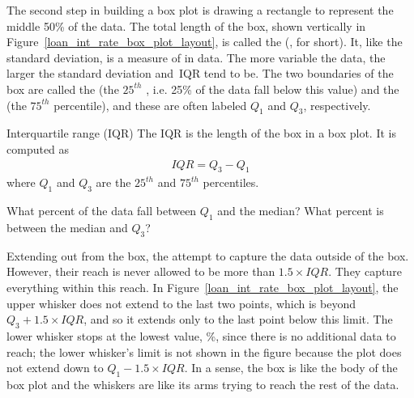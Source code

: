 The second step in building a box plot is drawing
a rectangle to represent the middle 50\% of the data.
The total length of the box, shown vertically in
Figure~\ref{loan_int_rate_box_plot_layout},
is called the  (,
for short).
It, like the standard deviation, is a measure
of  in data.
The more variable the data, the larger the standard
deviation and~IQR tend to be.
The two boundaries of the box are called the
 
(the $25^{th}$ ,
i.e. 25\% of the data fall below this value)
and the  
(the $75^{th}$ percentile), and these are often labeled $Q_1$
 and $Q_3$,
respectively.

\begin{onebox}{Interquartile range (IQR)}
  The IQR is the length
  of the box in a box plot.
  It is computed as
  \begin{eqnarray*}
  IQR = Q_3 - Q_1
  \end{eqnarray*}
  where $Q_1$ and $Q_3$ are the $25^{th}$ and $75^{th}$
  percentiles.
\end{onebox}

\begin{exercisewrap}
\begin{nexercise}
What percent of the data fall between $Q_1$ and the median?
What percent is between the median and $Q_3$?\footnotemark{}
\end{nexercise}
\end{exercisewrap}

Extending out from the box, the  attempt
to capture the data outside of the box.
However, their reach is never allowed to be more than
$1.5\times IQR$.
They capture everything within this reach.
In Figure~\ref{loan_int_rate_box_plot_layout},
the upper whisker does not extend to the last two points,
which is beyond $Q_3 + 1.5\times IQR$,
and so it extends only to the last point below this limit.
The lower whisker stops at the lowest value,
\loanSmallestValue{}\%,
since there is no additional data to reach;
the lower whisker's limit is not shown in the figure because
the plot does not extend down to $Q_1 - 1.5\times IQR$.
In a sense, the box is like the body of the box plot
and the whiskers are like its arms trying to reach the
rest of the data.

